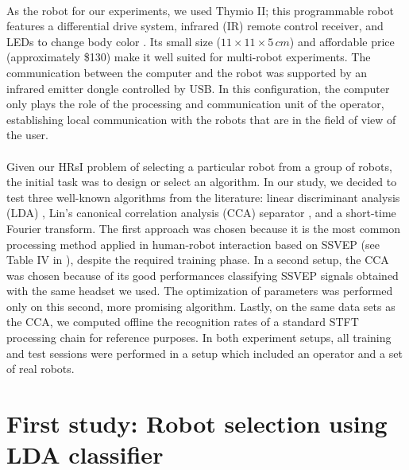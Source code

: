 \documentclass[smallextended]{svjour3}
\begin{document}
\\
As the robot for our experiments, we used Thymio II; this programmable robot features a differential drive system, infrared (IR) remote control receiver, and LEDs to change body color \cite{Riedo-et-al-2013}. Its small size ($11 \times 11 \times 5\,\mathit{cm}$) and affordable price (approximately \$130) make it well suited for multi-robot experiments. 
The communication between the computer and the robot was supported by an infrared emitter dongle controlled by USB. 
In this configuration, the computer only plays the role of the processing and communication unit of the operator, establishing local communication with the robots that are in the field of view of the user.\\
\\
Given our HRsI problem of selecting a particular robot from a group of robots, the initial task was to design or select an algorithm. 
In our study, we decided to test three well-known algorithms from the literature: linear discriminant analysis (LDA) \cite{openvibeSSVEP}, Lin's canonical correlation analysis (CCA) separator \cite{Lin2014},
and a short-time Fourier transform. The first approach was chosen because it is the most common processing method applied in human-robot interaction based on SSVEP (see Table IV in \cite{Bi2013}), despite the required training phase.
In a second setup, the CCA was chosen because of its good performances classifying SSVEP signals obtained with the same headset we used. The optimization of parameters was performed only on this second, more promising algorithm.
Lastly, on the same data sets as the CCA, we computed offline the recognition rates of a standard STFT processing chain for reference purposes.
In both experiment setups, all training and test sessions were performed in a setup which included an operator and a set of real robots.\\

\section{First study: Robot selection using LDA classifier}
\label{sec:ML_approach}
\end{document}
